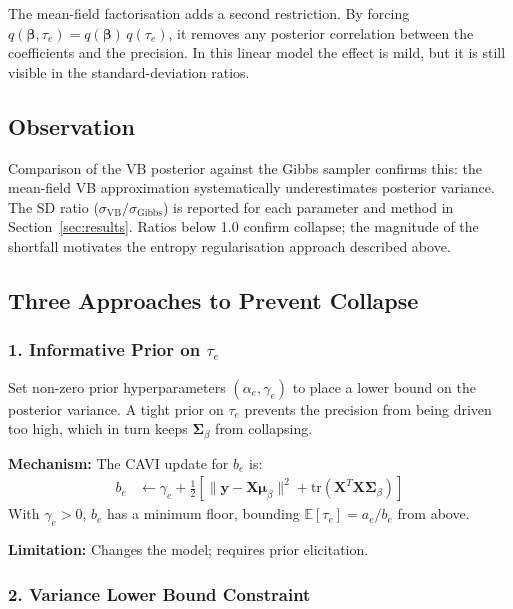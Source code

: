 \documentclass[11pt,a4paper]{article}
\begin{document}
The mean-field factorisation adds a second restriction. By forcing $q(\bm{\beta}, \tau_e) = q(\bm{\beta})\,q(\tau_e)$, it removes any posterior correlation between the coefficients and the precision. In this linear model the effect is mild, but it is still visible in the standard-deviation ratios.

\subsection*{Observation}

Comparison of the VB posterior against the Gibbs sampler confirms this: the mean-field VB approximation systematically underestimates posterior variance. The SD ratio ($\sigma_{\mathrm{VB}} / \sigma_{\mathrm{Gibbs}}$) is reported for each parameter and method in Section~\ref{sec:results}. Ratios below 1.0 confirm collapse; the magnitude of the shortfall motivates the entropy regularisation approach described above.

\subsection*{Three Approaches to Prevent Collapse}

\subsubsection*{1. Informative Prior on $\tau_e$}

Set non-zero prior hyperparameters $(\alpha_e, \gamma_e)$ to place a lower bound on the posterior variance. A tight prior on $\tau_e$ prevents the precision from being driven too high, which in turn keeps $\bm{\Sigma}_\beta$ from collapsing.

\textbf{Mechanism:} The CAVI update for $b_e$ is:
\begin{align}
  b_e &\leftarrow \gamma_e + \frac{1}{2}\left[\|\bm{y} - \bm{X}\bm{\mu}_\beta\|^2 + \mathrm{tr}(\bm{X}^T\bm{X}\bm{\Sigma}_\beta)\right]
\end{align}
With $\gamma_e > 0$, $b_e$ has a minimum floor, bounding $\mathbb{E}[\tau_e] = a_e/b_e$ from above.

\textbf{Limitation:} Changes the model; requires prior elicitation.

\subsubsection*{2. Variance Lower Bound Constraint}
\end{document}

